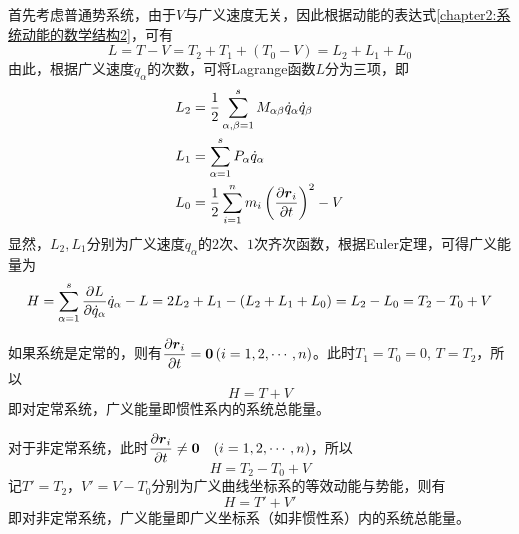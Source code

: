 首先考虑普通势系统，由于$V$与广义速度无关，因此根据动能的表达式\eqref{chapter2:系统动能的数学结构2}，可有
\begin{equation}
	L = T-V = T_2 + T_1 + (T_0 - V) = L_2 + L_1 + L_0
	\label{chapter2:Lagrange函数的数学结构}
\end{equation}
由此，根据广义速度$\dot{q}_\alpha$的次数，可将Lagrange函数$L$分为三项，即
\begin{align*}
	L_2 & = \frac12 \sum_{\alpha,\beta=1}^s M_{\alpha\beta} \dot{q}_\alpha \dot{q}_\beta \\
	L_1 & = \sum_{\alpha=1}^s P_\alpha \dot{q}_\alpha \\
	L_0 & = \frac12 \sum_{i=1}^n m_i \left(\frac{\partial \boldsymbol{r}_i}{\partial t}\right)^2 - V
\end{align*}
显然，$L_2,L_1$分别为广义速度$\dot{q}_\alpha$的$2$次、$1$次齐次函数，根据Euler定理，可得广义能量为
\begin{equation}
	H = \sum_{\alpha=1}^s \frac{\partial L}{\partial \dot{q}_\alpha} \dot{q}_\alpha - L = 2L_2 + L_1 - (L_2+L_1+L_0) = L_2 - L_0 = T_2 - T_0 + V
\end{equation}

如果系统是定常的，则有$\dfrac{\partial \boldsymbol{r}_i}{\partial t} = \boldsymbol{0}\, (i = 1,2,\cdots,n)$。此时$T_1 = T_0 = 0,\, T = T_2$，所以
\begin{equation}
	H = T+V
\end{equation}
即对定常系统，广义能量即惯性系内的系统总能量。

对于非定常系统，此时$\dfrac{\partial \boldsymbol{r}_i}{\partial t} \neq \boldsymbol{0}\quad (i = 1,2,\cdots,n)$，所以
\begin{equation}
	H = T_2-T_0+V
\end{equation}
记$T' = T_2$，$V'=V-T_0$分别为广义曲线坐标系的等效动能与势能，则有
\begin{equation}
	H = T'+V'
\end{equation}
即对非定常系统，广义能量即广义坐标系（如非惯性系）内的系统总能量。

